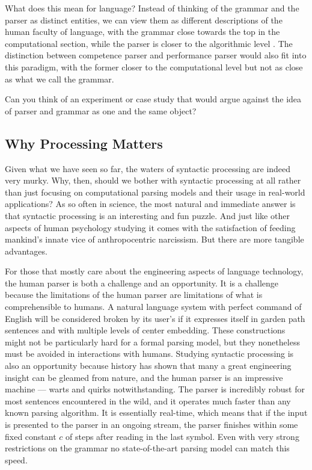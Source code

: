 What does this mean for language?
Instead of thinking of the grammar and the parser as distinct entities, we can view them as different descriptions of the human faculty of language, with the grammar close towards the top in the computational section, while the parser is closer to the algorithmic level \citep[cf.][]{NeelemanKoot10}.
The distinction between competence parser and performance parser would also fit into this paradigm, with the former closer to the computational level but not as close as what we call the grammar.

\begin{exercise}
    Can you think of an experiment or case study that would argue against the idea of parser and grammar as one and the same object?
\end{exercise}


\subsection{Why Processing Matters}

Given what we have seen so far, the waters of syntactic processing are indeed very murky.
Why, then, should we bother with syntactic processing at all rather than just focusing on computational parsing models and their usage in real-world applications?
As so often in science, the most natural and immediate answer is that syntactic processing is an interesting and fun puzzle.
And just like other aspects of human psychology studying it comes with the satisfaction of feeding mankind's innate vice of anthropocentric narcissism.
But there are more tangible advantages.

For those that mostly care about the engineering aspects of language technology, the human parser is both a challenge and an opportunity.
It is a challenge because the limitations of the human parser are limitations of what is comprehensible to humans.
A natural language system with perfect command of English will be considered broken by its user's if it expresses itself in garden path sentences and with multiple levels of center embedding.
These constructions might not be particularly hard for a formal parsing model, but they nonetheless must be avoided in interactions with humans.
Studying syntactic processing is also an opportunity because history has shown that many a great engineering insight can be gleamed from nature, and the human parser is an impressive machine --- warts and quirks notwithstanding.
The parser is incredibly robust for most sentences encountered in the wild, and it operates much faster than any known parsing algorithm.
It is essentially real-time, which means that if the input is presented to the parser in an ongoing stream, the parser finishes within some fixed constant $c$ of steps after reading in the last symbol. 
Even with very strong restrictions on the grammar no state-of-the-art parsing model can match this speed.

